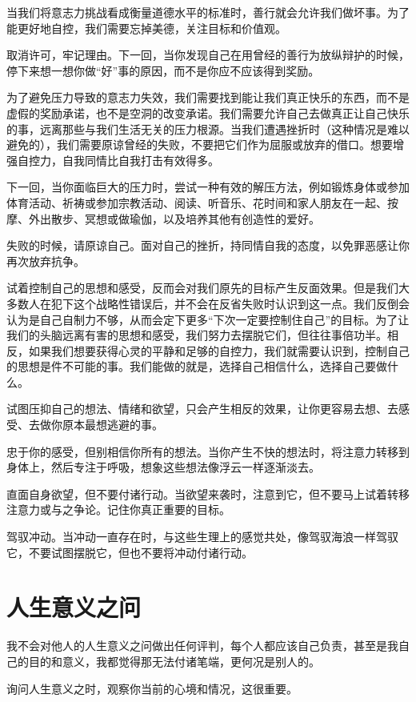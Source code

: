 \documentclass[12pt,oneside]{book}
\begin{document}
当我们将意志力挑战看成衡量道德水平的标准时，善行就会允许我们做坏事。为了能更好地自控，我们需要忘掉美德，关注目标和价值观。

取消许可，牢记理由。下一回，当你发现自己在用曾经的善行为放纵辩护的时候，停下来想一想你做“好”事的原因，而不是你应不应该得到奖励。

为了避免压力导致的意志力失效，我们需要找到能让我们真正快乐的东西，而不是虚假的奖励承诺，也不是空洞的改变承诺。我们需要允许自己去做真正让自己快乐的事，远离那些与我们生活无关的压力根源。当我们遭遇挫折时（这种情况是难以避免的），我们需要原谅曾经的失败，不要把它们作为屈服或放弃的借口。想要增强自控力，自我同情比自我打击有效得多。

下一回，当你面临巨大的压力时，尝试一种有效的解压方法，例如锻炼身体或参加体育活动、祈祷或参加宗教活动、阅读、听音乐、花时间和家人朋友在一起、按摩、外出散步、冥想或做瑜伽，以及培养其他有创造性的爱好。

失败的时候，请原谅自己。面对自己的挫折，持同情自我的态度，以免罪恶感让你再次放弃抗争。

试着控制自己的思想和感受，反而会对我们原先的目标产生反面效果。但是我们大多数人在犯下这个战略性错误后，并不会在反省失败时认识到这一点。我们反倒会认为是自己自制力不够，从而会定下更多“下次一定要控制住自己”的目标。为了让我们的头脑远离有害的思想和感受，我们努力去摆脱它们，但往往事倍功半。相反，如果我们想要获得心灵的平静和足够的自控力，我们就需要认识到，控制自己的思想是件不可能的事。我们能做的就是，选择自己相信什么，选择自己要做什么。

试图压抑自己的想法、情绪和欲望，只会产生相反的效果，让你更容易去想、去感受、去做你原本最想逃避的事。

忠于你的感受，但别相信你所有的想法。当你产生不快的想法时，将注意力转移到身体上，然后专注于呼吸，想象这些想法像浮云一样逐渐淡去。

直面自身欲望，但不要付诸行动。当欲望来袭时，注意到它，但不要马上试着转移注意力或与之争论。记住你真正重要的目标。

驾驭冲动。当冲动一直存在时，与这些生理上的感觉共处，像驾驭海浪一样驾驭它，不要试图摆脱它，但也不要将冲动付诸行动。




\section{人生意义之问}
我不会对他人的人生意义之问做出任何评判，每个人都应该自己负责，甚至是我自己的目的和意义，我都觉得那无法付诸笔端，更何况是别人的。

询问人生意义之时，观察你当前的心境和情况，这很重要。
\end{document}
